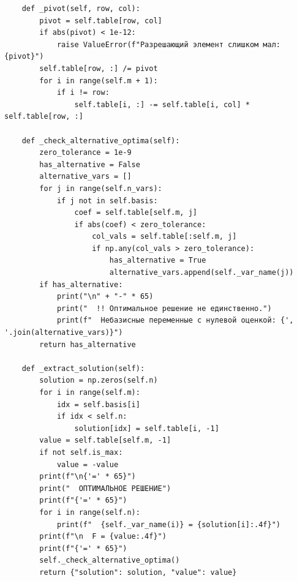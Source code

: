 \documentclass[oneside,a4paper,14pt]{extarticle}
\begin{document}
\begin{verbatim}
    def _pivot(self, row, col):
        pivot = self.table[row, col]
        if abs(pivot) < 1e-12:
            raise ValueError(f"Разрешающий элемент слишком мал: {pivot}")
        self.table[row, :] /= pivot
        for i in range(self.m + 1):
            if i != row:
                self.table[i, :] -= self.table[i, col] * self.table[row, :]

    def _check_alternative_optima(self):
        zero_tolerance = 1e-9
        has_alternative = False
        alternative_vars = []
        for j in range(self.n_vars):
            if j not in self.basis:
                coef = self.table[self.m, j]
                if abs(coef) < zero_tolerance:
                    col_vals = self.table[:self.m, j]
                    if np.any(col_vals > zero_tolerance):
                        has_alternative = True
                        alternative_vars.append(self._var_name(j))
        if has_alternative:
            print("\n" + "-" * 65)
            print("  !! Оптимальное решение не единственно.")
            print(f"  Небазисные переменные с нулевой оценкой: {', '.join(alternative_vars)}")
        return has_alternative

    def _extract_solution(self):
        solution = np.zeros(self.n)
        for i in range(self.m):
            idx = self.basis[i]
            if idx < self.n:
                solution[idx] = self.table[i, -1]
        value = self.table[self.m, -1]
        if not self.is_max:
            value = -value
        print(f"\n{'=' * 65}")
        print("  ОПТИМАЛЬНОЕ РЕШЕНИЕ")
        print(f"{'=' * 65}")
        for i in range(self.n):
            print(f"  {self._var_name(i)} = {solution[i]:.4f}")
        print(f"\n  F = {value:.4f}")
        print(f"{'=' * 65}")
        self._check_alternative_optima()
        return {"solution": solution, "value": value}


\end{verbatim}
\end{document}
